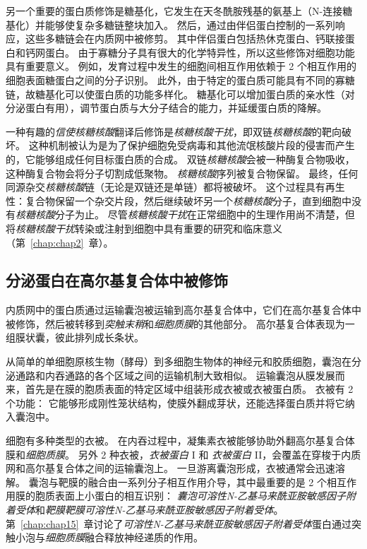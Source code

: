 另一个重要的蛋白质修饰是糖基化，它发生在天冬酰胺残基的氨基上（N-连接糖基化）并能够使复杂多糖链整块加入。
然后，通过由伴侣蛋白控制的一系列响应，这些多糖链会在内质网中被修剪。
其中伴侣蛋白包括热休克蛋白、钙联接蛋白和钙网蛋白。
由于寡糖分子具有很大的化学特异性，所以这些修饰对细胞功能具有重要意义。
例如，发育过程中发生的细胞间相互作用依赖于 2 个相互作用的细胞表面糖蛋白之间的分子识别。
此外，由于特定的蛋白质可能具有不同的寡糖链，故糖基化可以使蛋白质的功能多样化。
糖基化可以增加蛋白质的亲水性（对分泌蛋白有用），调节蛋白质与大分子结合的能力，并延缓蛋白质的降解。


一种有趣的\textit{信使核糖核酸}翻译后修饰是\textit{核糖核酸干扰}，即双链\textit{核糖核酸}的靶向破坏。
这种机制被认为是为了保护细胞免受病毒和其他流氓核酸片段的侵害而产生的，它能够组成任何目标蛋白质的合成。 
双链\textit{核糖核酸}会被一种酶复合物吸收，这种酶复合物会将分子切割成低聚物。
\textit{核糖核酸}序列被复合物保留。
最终，任何同源杂交\textit{核糖核酸}链（无论是双链还是单链）都将被破坏。
这个过程具有再生性：复合物保留一个杂交片段，然后继续破坏另一个\textit{核糖核酸}分子，直到细胞中没有\textit{核糖核酸}分子为止。
尽管\textit{核糖核酸干扰}在正常细胞中的生理作用尚不清楚，但将\textit{核糖核酸干扰}转染或注射到细胞中具有重要的研究和临床意义（第~\ref{chap:chap2}~章）。



\subsection{分泌蛋白在高尔基复合体中被修饰}

内质网中的蛋白质通过运输囊泡被运输到高尔基复合体中，它们在高尔基复合体中被修饰，然后被转移到\textit{突触末稍}和\textit{细胞质膜}的其他部分。
高尔基复合体表现为一组膜状囊，彼此排列成长条状。


从简单的单细胞原核生物（酵母）到多细胞生物体的神经元和胶质细胞，囊泡在分泌通路和内吞通路的各个区域之间的运输机制大致相似。
运输囊泡从膜发展而来，首先是在膜的胞质表面的特定区域中组装形成衣被或衣被蛋白质。
衣被有 2 个功能：
它能够形成刚性笼状结构，使膜外翻成芽状，还能选择蛋白质并将它纳入囊泡中。


细胞有多种类型的衣被。
在内吞过程中，凝集素衣被能够协助外翻高尔基复合体膜和\textit{细胞质膜}。
另外 2 种衣被，\textit{衣被蛋白} I 和 \textit{衣被蛋白} II，会覆盖在穿梭于内质网和高尔基复合体之间的运输囊泡上。
一旦游离囊泡形成，衣被通常会迅速溶解。
囊泡与靶膜的融合由一系列分子相互作用介导，其中最重要的是 2 个相互作用膜的胞质表面上小蛋白的相互识别：
\textit{囊泡可溶性N-乙基马来酰亚胺敏感因子附着受体}和\textit{靶膜靶膜可溶性N-乙基马来酰亚胺敏感因子附着受体}。
第~\ref{chap:chap15}~章讨论了\textit{可溶性N-乙基马来酰亚胺敏感因子附着受体}蛋白通过突触小泡与\textit{细胞质膜}融合释放神经递质的作用。


